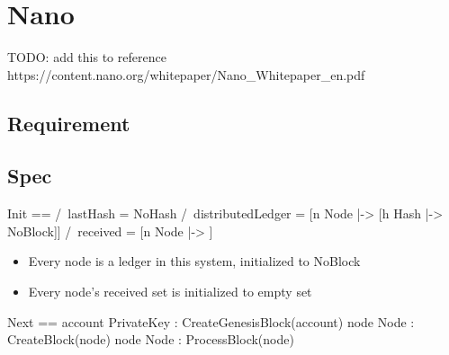 
% 

\chapter{Nano}

TODO: add this to reference\newline
https://content.nano.org/whitepaper/Nano\_Whitepaper\_en.pdf

\section{Requirement}

\section{Spec}

\begin{tla}
Init ==
    /\ lastHash = NoHash
    /\ distributedLedger = [n \in Node |-> [h \in Hash |-> NoBlock]]
    /\ received = [n \in Node |-> {}]
\end{tla}
\begin{tlatex}
%
%
%
\end{tlatex}

\begin{itemize}
    \item Every node is a ledger in this system, initialized to NoBlock
    \item Every node's received set is initialized to empty set
\end{itemize}

\begin{tla}
Next ==
    \/ \E account \in PrivateKey : CreateGenesisBlock(account)
    \/ \E node \in Node : CreateBlock(node)
    \/ \E node \in Node : ProcessBlock(node)
\end{tla}
\begin{tlatex}
%
%
%
\end{tlatex}
\newline

